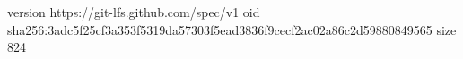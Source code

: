 version https://git-lfs.github.com/spec/v1
oid sha256:3adc5f25cf3a353f5319da57303f5ead3836f9cecf2ac02a86c2d59880849565
size 824
